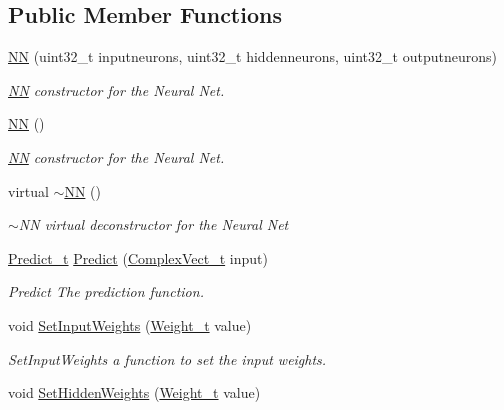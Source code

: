 \subsection*{Public Member Functions}
\begin{DoxyCompactItemize}
\item 
\hyperlink{class_soil_math_1_1_n_n_a46efd1eb7e31be2818c9858b640fcb5b}{N\+N} (uint32\+\_\+t inputneurons, uint32\+\_\+t hiddenneurons, uint32\+\_\+t outputneurons)
\begin{DoxyCompactList}\small\item\em \hyperlink{class_soil_math_1_1_n_n}{N\+N} constructor for the Neural Net. \end{DoxyCompactList}\item 
\hyperlink{class_soil_math_1_1_n_n_a778606ea8a193479da233a030d1df234}{N\+N} ()
\begin{DoxyCompactList}\small\item\em \hyperlink{class_soil_math_1_1_n_n}{N\+N} constructor for the Neural Net. \end{DoxyCompactList}\item 
virtual \hyperlink{class_soil_math_1_1_n_n_a37cb0ebe3576af3cf47c2e6330e1b34a}{$\sim$\+N\+N} ()
\begin{DoxyCompactList}\small\item\em $\sim$\+N\+N virtual deconstructor for the Neural Net \end{DoxyCompactList}\item 
\hyperlink{_soil_math_types_8h_aaeba766195a440b2539f0438d3d41f95}{Predict\+\_\+t} \hyperlink{class_soil_math_1_1_n_n_aa7f23fcdb8383a74586c9c30b8bc0af7}{Predict} (\hyperlink{_soil_math_types_8h_a7567e521c2b2c408dcb62dbff72390f7}{Complex\+Vect\+\_\+t} input)
\begin{DoxyCompactList}\small\item\em Predict The prediction function. \end{DoxyCompactList}\item 
void \hyperlink{class_soil_math_1_1_n_n_a411371d8297e9d1ff10c919d1293d80e}{Set\+Input\+Weights} (\hyperlink{_soil_math_types_8h_ac56ad2b88186620fd0de0d213aa715dd}{Weight\+\_\+t} value)
\begin{DoxyCompactList}\small\item\em Set\+Input\+Weights a function to set the input weights. \end{DoxyCompactList}\item 
void \hyperlink{class_soil_math_1_1_n_n_a8465f4fd2aebe181601c4be31df47ffd}{Set\+Hidden\+Weights} (\hyperlink{_soil_math_types_8h_ac56ad2b88186620fd0de0d213aa715dd}{Weight\+\_\+t} value)

\end{DoxyCompactItemize}
